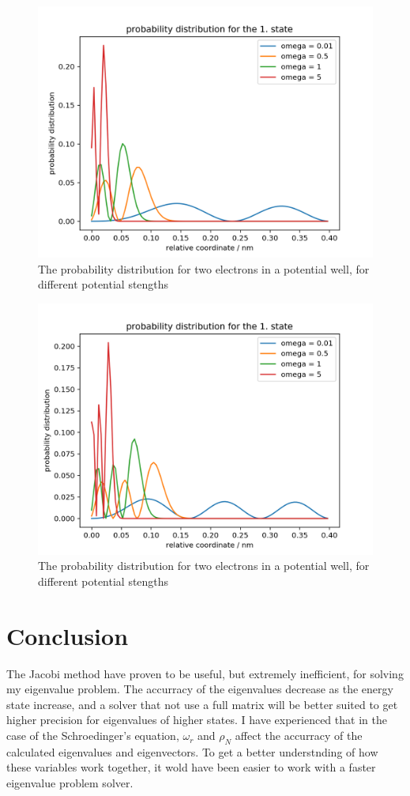 \documentclass{article}
\begin{document}
\begin{figure}
  \includegraphics[width=\linewidth]{first_state.png}
  \caption{The probability distribution for two electrons in a potential well, for different potential stengths}
  \label{fig:first_state}
\end{figure}

\begin{figure}
  \includegraphics[width=\linewidth]{second_state.png}
  \caption{The probability distribution for two electrons in a potential well, for different potential stengths}
  \label{fig:second_state}
\end{figure}

\section{Conclusion}
The Jacobi method have proven to be useful, but extremely inefficient, for solving my eigenvalue problem. The accurracy of the eigenvalues decrease as the energy state increase, and a solver that not use a full matrix will be better suited to get higher precision for eigenvalues of higher states. I have experienced that in the case of the Schroedinger's equation, $\omega_r$ and $\rho_N$  affect the accurracy of the calculated eigenvalues and eigenvectors. To get a better understnding of how these variables work together, it wold have been easier to work with a faster eigenvalue problem solver. 
\end{document}
